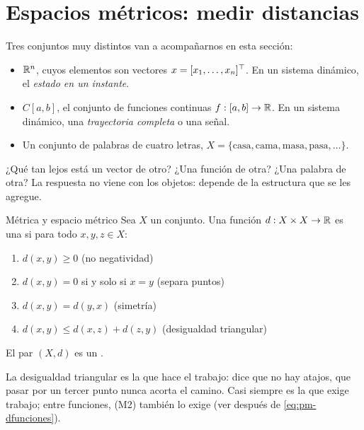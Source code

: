 \section{Espacios métricos: medir distancias}
\label{sec:pm-metricos}

Tres conjuntos muy distintos van a acompañarnos en esta sección:
\begin{itemize}
  \item $\mathbb{R}^n$, cuyos elementos son vectores $x=[x_1,\dots,x_n]^{\top}$. En un sistema dinámico, el \emph{estado en un instante}.
  \item $C[a,b]$, el conjunto de funciones continuas $f:[a,b]\to\mathbb{R}$. En un sistema dinámico, una \emph{trayectoria completa} o una señal.
  \item Un conjunto de palabras de cuatro letras, $X=\{\text{casa},\text{cama},\text{masa},\text{pasa},\dots\}$.
\end{itemize}
¿Qué tan lejos está un vector de otro? ¿Una función de otra? ¿Una palabra de otra? La respuesta no viene con los objetos: depende de la estructura que se les agregue.

\begin{definicion}[label=def:pm-metrica]{Métrica y espacio métrico}
Sea $X$ un conjunto. Una función $d:X\times X\to\mathbb{R}$ es una  si para todo $x,y,z\in X$:
\begin{enumerate}[label=(M\arabic*),leftmargin=3em]
  \item $d(x,y)\ge0$ \hfill(no negatividad)
  \item $d(x,y)=0$ si y solo si $x=y$ \hfill(separa puntos)
  \item $d(x,y)=d(y,x)$ \hfill(simetría)
  \item $d(x,y)\le d(x,z)+d(z,y)$ \hfill(desigualdad triangular)
\end{enumerate}
El par $(X,d)$ es un .
\end{definicion}

La desigualdad triangular es la que hace el trabajo: dice que no hay atajos, que pasar por un tercer punto nunca acorta el camino. Casi siempre es la que exige trabajo; entre funciones, (M2) también lo exige (ver después de \eqref{eq:pm-dfunciones}).


